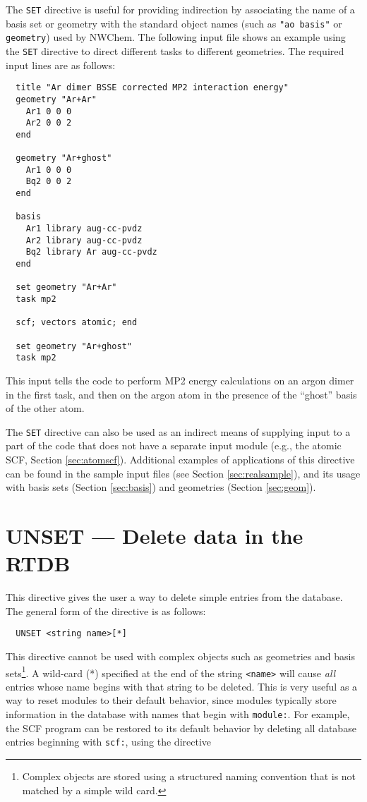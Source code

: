 The \verb+SET+ directive is useful for providing indirection by
associating the name of a basis set or geometry with the standard
object names (such as \verb+"ao basis"+ or \verb+geometry+) used by
NWChem.  The following input file shows an example using the
\verb+SET+ directive to direct different tasks to different
geometries.  The required input lines are as follows:

\begin{verbatim}
  title "Ar dimer BSSE corrected MP2 interaction energy"
  geometry "Ar+Ar"
    Ar1 0 0 0
    Ar2 0 0 2
  end

  geometry "Ar+ghost"
    Ar1 0 0 0
    Bq2 0 0 2
  end

  basis
    Ar1 library aug-cc-pvdz
    Ar2 library aug-cc-pvdz
    Bq2 library Ar aug-cc-pvdz
  end

  set geometry "Ar+Ar"
  task mp2 

  scf; vectors atomic; end

  set geometry "Ar+ghost"
  task mp2 
\end{verbatim}

This input tells the code to perform MP2 energy calculations 
on an argon dimer in the first task, and then
on the argon atom in the presence of the ``ghost'' basis of the other
atom.

The \verb+SET+ directive can also be used as an indirect means of
supplying input to a part of the code that does not have a separate
input module (e.g., the atomic SCF, Section \ref{sec:atomscf}).
Additional examples of applications of this directive can be found in
the sample input files (see Section \ref{sec:realsample}), and
its usage with basis sets (Section \ref{sec:basis}) and geometries
(Section \ref{sec:geom}).

\section{UNSET --- Delete data in the RTDB}
\label{sec:unset}

This directive gives the user a way to delete simple entries from the
database.  The general form of the directive is as follows:

\begin{verbatim}
  UNSET <string name>[*]
\end{verbatim}

This directive cannot be used with complex objects such as geometries
and basis sets\footnote{Complex objects are stored using a structured
  naming convention that is not matched by a simple wild card.}.  A
wild-card (*) specified at the end of the string \verb+<name>+ will
cause {\em all} entries whose name begins with that string to be
deleted.  This is very useful as a way to reset modules to their
default behavior, since modules typically store information in the
database with names that begin with \verb+module:+.  For example, the
SCF program can be restored to its default behavior by deleting all
database entries beginning with \verb+scf:+, using the directive

